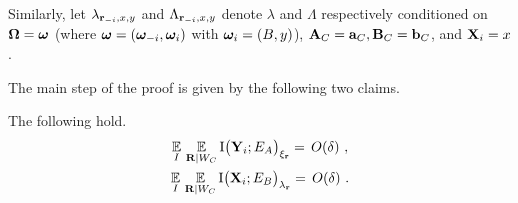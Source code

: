 Similarly, let $\lambda_{\mathbf{r}_{-i},x,y}$ and $\Lambda_{\mathbf{r}_{-i},x,y}$ denote $\lambda$ and $\Lambda$ respectively conditioned on ${\boldsymbol{\Omega}} = {\boldsymbol{\omega}}$ (where ${\boldsymbol{\omega}} = ({\boldsymbol{\omega}}_{-i},{\boldsymbol{\omega}}_i)$ with ${\boldsymbol{\omega}}_i = (B,y)$), $\mathbf{A}_C = \mathbf{a}_C, \mathbf{B}_C = \mathbf{b}_C$, and $\mathbf{X}_i = x$.
%

The main step of the proof is given by the following two claims. 

\begin{claim}\label{claim:xi-change-x}
The following hold.
\begin{gather}
\operatorname*{\mathbb{E}}_I \,  \operatorname*{\mathbb{E}}_{\mathbf{R} | W_C} \mathrm{I} \big (\mathbf{Y}_i ; E_A\big )_{\xi_{\mathbf{r}}} = \, O(\delta)~, \label{eq:xi-change-1}\\
\operatorname*{\mathbb{E}}_I \,  \operatorname*{\mathbb{E}}_{\mathbf{R} | W_C} \mathrm{I} \big (\mathbf{X}_i ; E_B\big )_{\lambda_{\mathbf{r}}} = \, O(\delta)~. \label{eq:xi-change-2}
\end{gather}
\end{claim}

